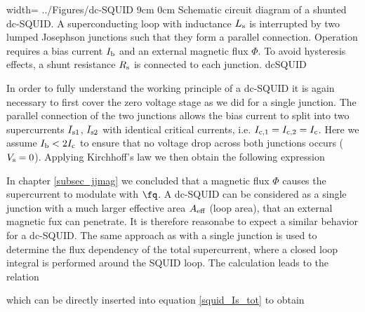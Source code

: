 {width=\textwidth} %
{../Figures/dc-SQUID}
{9cm} %
{0cm}
{Schematic circuit diagram of a shunted dc-SQUID. A superconducting loop with inductance $L_{\rm s}$ is interrupted by two lumped Josephson junctions such that they form a parallel connection. Operation requires a bias current $I_{\rm b}$ and an external magnetic flux $\Phi$. To avoid hysteresis effects, a shunt resistance $R_{\rm s}$ is connected to each junction.} 
{dcSQUID}

In order to fully understand the working principle of a dc-SQUID it is again necessary to first cover the zero voltage stage as we did for a single junction. 
The parallel connection of the two junctions allows the bias current to split into two supercurrents $I_{\rm s1}$, $I_{\rm s2}$ with identical critical currents, i.e. $I_{\rm c,1}=I_{\rm c,2}=I_{\rm c}$. Here we assume $I_{\rm b}<2I_{\rm c}$ to ensure that no voltage drop across both junctions occurs ($V_{\rm s}=0$). Applying Kirchhoff's law we then obtain the following expression 


In chapter \ref{subsec_jjmag} we concluded that a magnetic flux $\Phi$ causes the supercurrent to modulate with $\unit{\fq}$. A dc-SQUID can be considered as a single junction with a much larger effective area $A_{\rm eff}$ (loop area), that an external magnetic fux can penetrate. It is therefore reasonabe to expect a similar behavior for a dc-SQUID. The same approach as with a single junction is used to determine the flux dependency of the total supercurrent, where a closed loop integral is performed around the SQUID loop. The calculation leads to the relation \cite{Gross2016} 


which can be directly inserted into equation \ref{squid_Is_tot} to obtain




